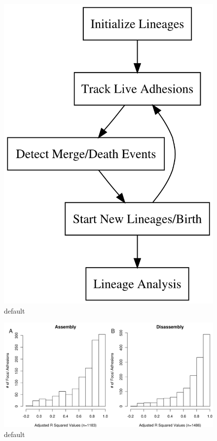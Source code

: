 \documentclass[letterpaper]{article}
\begin{document}
\begin{figure}[htbp]
\begin{center}
\includegraphics{../figures/supplemental/tracking_flowchart}
\caption{default}
\label{default}
\end{center}
\end{figure}

\begin{figure}[htbp]
\begin{center}
\includegraphics[width=\textwidth]{../figures/supplemental/R_squared}
\caption{default}
\label{default}
\end{center}
\end{figure}
\end{document}
